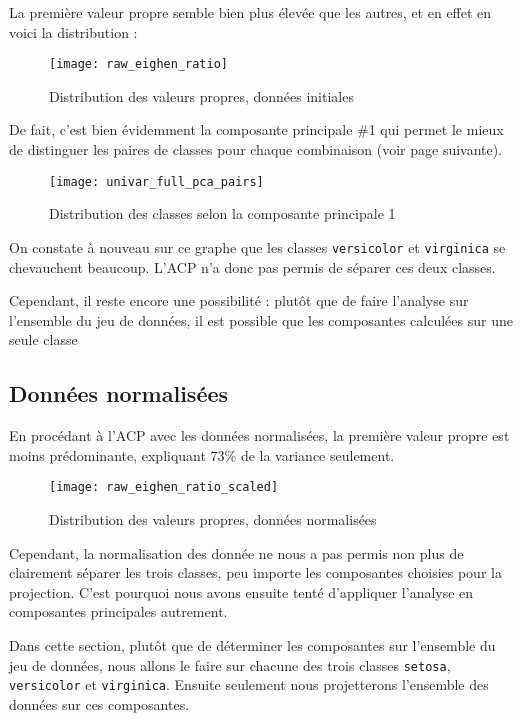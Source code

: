 \documentclass[french]{report}
\begin{document}
    La première valeur propre semble bien plus élevée que les autres, et en effet en voici la distribution :
    
    \begin{figure}[h]
        \centering
        \texttt{[image: raw\_eighen\_ratio]}
        \caption{Distribution des valeurs propres, données initiales}
    \end{figure}
    \leavevmode
    
    De fait, c'est bien évidemment la composante principale \#1 qui permet le mieux de distinguer les paires de classes pour chaque combinaison (voir page suivante).
    
    \begin{figure}[h]
        \centering
        \texttt{[image: univar\_full\_pca\_pairs]}
        \caption{Distribution des classes selon la composante principale 1}
    \end{figure}
    
    On constate à nouveau sur ce graphe que les classes \texttt{versicolor} et \texttt{virginica} se chevauchent beaucoup.
    L'ACP n'a donc pas permis de séparer ces deux classes.
    
    Cependant, il reste encore une possibilité : plutôt que de faire l'analyse sur l'ensemble du jeu de données, il est possible que les composantes calculées sur une seule classe
    
    \subsection{Données normalisées}
    
    En procédant à l'ACP avec les données normalisées, la première valeur propre est moins prédominante, expliquant 73\% de la variance seulement.
    
    \begin{figure}[h]
        \centering
        \texttt{[image: raw\_eighen\_ratio\_scaled]}
        \caption{Distribution des valeurs propres, données normalisées}
    \end{figure}
    
    
    Cependant, la normalisation des donnée ne nous a pas permis non plus de clairement séparer les trois classes, peu importe les composantes choisies pour la projection.
    C'est pourquoi nous avons ensuite tenté d'appliquer l'analyse en composantes principales autrement.
    
    
    Dans cette section, plutôt que de déterminer les composantes sur l'ensemble du jeu de données, nous allons le faire sur chacune des trois classes \texttt{setosa}, \texttt{versicolor} et \texttt{virginica}.
    Ensuite seulement nous projetterons l'ensemble des données sur ces composantes.
    
\end{document}
